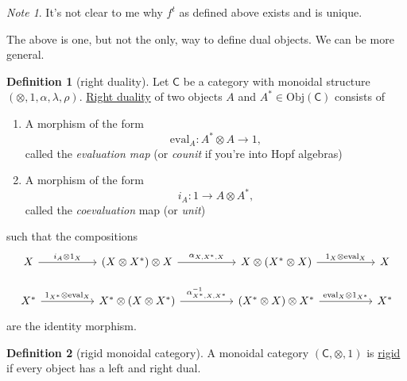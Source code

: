 \documentclass[a4paper]{report}
\newcommand{\defn}[1]{\ul{#1}}
\newcommand{\Obj}{\mathrm{Obj}}
\newcommand{\ev}{\mathrm{eval}}
\theoremstyle{definition}
\newtheorem{definition}{Definition}[section]
\theoremstyle{plain}
\theoremstyle{remark}
\newtheorem{note}{Note}[section]
\begin{document}
\begin{note}
  It's not clear to me why $f^{t}$ as defined above exists and is unique.
\end{note}

The above is one, but not the only, way to define dual objects. We can be more general.
\begin{definition}[right duality]
  \label{def:rightduality}
  Let $\mathsf{C}$ be a category with monoidal structure $(\otimes, 1, \alpha, \lambda, \rho)$. \defn{Right duality} of two objects $A$ and $A^{*} \in \Obj(\mathsf{C})$ consists of
  \begin{enumerate}
    \item A morphism of the form
      \begin{equation*}
        \ev_{A}\colon A^{*} \otimes A \to 1,
      \end{equation*}
      called the \emph{evaluation map} (or \emph{counit} if you're into Hopf algebras)

    \item A morphism of the form
      \begin{equation*}
        i_{A}\colon 1 \to A \otimes A^{*},
      \end{equation*}
      called the \emph{coevaluation} map (or \emph{unit})
  \end{enumerate}
  such that the compositions
  \begin{equation*}
    \begin{tikzcd}[column sep=huge]
      X 
      \arrow[r, "i_{A} \otimes 1_{X}"]
      & (X \otimes X^{*}) \otimes X
      \arrow[r, "{\alpha_{X, X^{*}, X}}"]
      & X \otimes (X^{*} \otimes X) 
      \arrow[r, "{1_{X} \otimes \ev_{X}}"]
      & X
      \\
      X^{*}
      \arrow[r, "{1_{X^{*}} \otimes \ev_{X}}"]
      & X^{*} \otimes (X \otimes X^{*})
      \arrow[r, "{\alpha^{-1}_{X^{*}, X, X^{*}}}"]
      & (X^{*} \otimes X) \otimes X^{*}
      \arrow[r, "{\ev_{X}\otimes 1_{X^{*}}}"]
      & X^{*}
    \end{tikzcd}
  \end{equation*}
  are the identity morphism.
\end{definition}

\begin{definition}[rigid monoidal category]
  \label{def:rigidmonoidalcategory}
  A monoidal category $(\mathsf{C}, \otimes, 1)$ is \defn{rigid} if every object has a left and right dual.
\end{definition}
\end{document}
